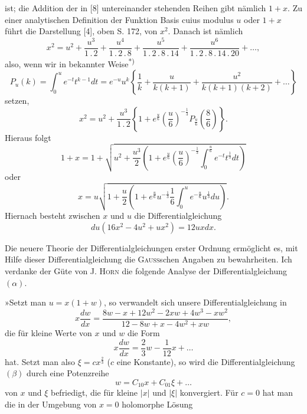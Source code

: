 \noindent ist; die Addition der in [8] untereinander stehenden Reihen gibt nämlich $1+x$. Zu einer analytischen Definition der Funktion Basis cuius modulus $u$ oder $1+x$ führt die Darstellung [4], oben S. 172, von $x^2$. Danach ist nämlich
\begin{equation*}\tag*{$[4]'$}x^2=u^2+\frac{u^3}{1\, .\,2}+\frac{u^4}{1\, .\,2\, .\,8}+\frac{u^5}{1\, .\,2\, .\,8\, .\,14}+\frac{u^6}{1\, .\,2\, .\,8\, .\,14\, .\,20}+\ldots,\end{equation*}
\noindent also, wenn wir in bekannter Weise\textsuperscript{*)}
\[
P_u(k)=\int_0^u e^{-t}t^{k-1}dt=e^{-u}u^k\left\{\frac1k+\frac{u}{k(k+1)}+\frac{u^2}{k(k+1)(k+2)}+\ldots\right\}
\]
\noindent setzen,
\begin{equation*}\tag*{$[4]''$}x^2=u^2+\frac{u^3}{1\, .\,2}\left\{1+e^{\frac u6}\left(\frac u6\right)^{-\frac13}P_{\frac u6}\left(\frac86\right)\right\}.\end{equation*}
\noindent Hieraus folgt
\[1+x=1+\sqrt{u^2+\frac{u^3}{2}\left(1+e^{\frac u6}\left(\frac u6\right)^{-\frac13}\int_0^{\frac u6}e^{-t}t^{\frac13}dt\right)}\]
\noindent oder
\begin{equation*}\tag*{$[3]''$}x=u\sqrt{1+\frac u2\left(1+e^{\frac u6}u^{-\frac13}\frac16\int_0^u e^{-\frac u6}u^{\frac13}du\right)}.\end{equation*}
\noindent Hiernach besteht zwischen $x$ und $u$ die Differentialgleichung
\begin{equation*}\tag*{$(\alpha)$}du(16x^2-4u^2+ux^2)=12uxdx.\end{equation*}
\par\indent Die neuere Theorie der Differentialgleichungen erster Ordnung ermöglicht es, mit Hilfe dieser Differentialgleichung die \textsc{Gauss}schen Angaben zu bewahrheiten. Ich verdanke der Güte von J. \textsc{Horn} die folgende Analyse der Differentialgleichung $(\alpha)$.
\par\indent »Setzt man $u=x(1+w)$, so verwandelt sich unsere Differentialgleichung in
\begin{equation*}\tag*{$(\beta)$}x\frac{dw}{dx}=\frac{8w-x+12w^2-2xw+4w^3-xw^2}{12-8w+x-4w^2+xw},\end{equation*}
\noindent die für kleine Werte von $x$ und $w$ die Form
\[x\frac{dw}{dx}=\frac23w-\frac1{12}x+\ldots\]
\noindent hat. Setzt man also $\xi=cx^{\frac23}$ ($c$ eine Konstante), so wird die Differentialgleichung $(\beta)$ durch eine Potenzreihe
\[w=C_{10}x+C_{01}\xi+\ldots\]
\noindent von $x$ und $\xi$ befriedigt, die für kleine $|x|$ und $|\xi|$ konvergiert. Für $c=0$ hat man die in der Umgebung von $x=0$ holomorphe Lösung
